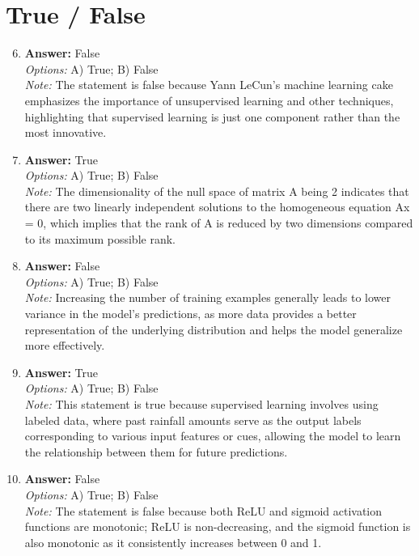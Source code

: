 \documentclass[12pt]{article}
\begin{document}
\section*{True / False}
\begin{enumerate}[label=\arabic*.]
\setcounter{enumi}{5}
\item \textbf{Answer:} False
\\ \textit{Options:} A) True; B) False
\\ \textit{Note:} The statement is false because Yann LeCun's machine learning cake emphasizes the importance of unsupervised learning and other techniques, highlighting that supervised learning is just one component rather than the most innovative.
\item \textbf{Answer:} True
\\ \textit{Options:} A) True; B) False
\\ \textit{Note:} The dimensionality of the null space of matrix A being 2 indicates that there are two linearly independent solutions to the homogeneous equation Ax = 0, which implies that the rank of A is reduced by two dimensions compared to its maximum possible rank.
\item \textbf{Answer:} False
\\ \textit{Options:} A) True; B) False
\\ \textit{Note:} Increasing the number of training examples generally leads to lower variance in the model's predictions, as more data provides a better representation of the underlying distribution and helps the model generalize more effectively.
\item \textbf{Answer:} True
\\ \textit{Options:} A) True; B) False
\\ \textit{Note:} This statement is true because supervised learning involves using labeled data, where past rainfall amounts serve as the output labels corresponding to various input features or cues, allowing the model to learn the relationship between them for future predictions.
\item \textbf{Answer:} False
\\ \textit{Options:} A) True; B) False
\\ \textit{Note:} The statement is false because both ReLU and sigmoid activation functions are monotonic; ReLU is non-decreasing, and the sigmoid function is also monotonic as it consistently increases between 0 and 1.
\end{enumerate}
\end{document}
